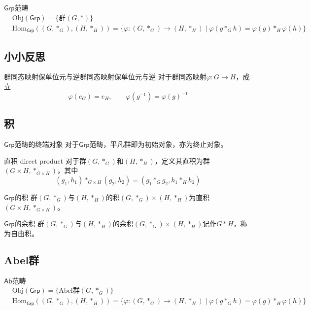 \begin{definition}{$\mathsf{Grp}$范畴}
	\begin{align*}
		&\mathrm{Obj}(\mathsf{Grp})=\{ \text{群} (G,*) \}\\
		&\mathrm{Hom}_\mathsf{Grp}((G,*_G),(H,*_H))=\{ \varphi:(G,*_G)\to (H,*_H)\mid \varphi(g*_G h)=\varphi(g)*_H\varphi(h)\}
	\end{align*}
\end{definition}

\subsection{小小反思}

\begin{proposition}{群同态映射保单位元与逆}{群同态映射保单位元与逆}
	对于群同态映射$\varphi:G\to H$，成立
	$$
	\varphi(e_G)=e_H,\qquad 
	\varphi(g^{-1})=\varphi(g)^{-1}
	$$
\end{proposition}

\subsection{积}

\begin{proposition}{$\mathsf{Grp}$范畴的终端对象}
	对于$\mathsf{Grp}$范畴，平凡群即为初始对象，亦为终止对象。
\end{proposition}

\begin{definition}{直积 direct product}
	对于群$(G,*_G)$和$(H,*_H)$，定义其直积为群$(G\times H,*_{G\times H})$，其中
	$$
	(g_1,h_1)*_{G\times H}(g_2,h_2)=(g_1*_Gg_2,h_1*_Hh_2)
	$$
\end{definition}

\begin{definition}{$\mathsf{Grp}$的积}
	群$(G,*_G)$与$(H,*_H)$的积$(G,*_G)\times (H,*_H)$为直积$(G\times H,*_{G\times H})$。
\end{definition}

\begin{definition}{$\mathsf{Grp}$的余积}
	群$(G,*_G)$与$(H,*_H)$的余积$(G,*_G)\times (H,*_H)$记作$G*H$，称为自由积。
\end{definition}

\subsection{Abel群}

\begin{definition}{$\mathsf{Ab}$范畴}
	\begin{align*}
		&\mathrm{Obj}(\mathsf{Grp})=\{ \text{Abel群} (G,*_G) \}\\
		&\mathrm{Hom}_\mathsf{Grp}((G,*_G),(H,*_H))=\{ \varphi:(G,*_G)\to (H,*_H)\mid \varphi(g*_G h)=\varphi(g)*_H\varphi(h)\}
	\end{align*}
\end{definition}

